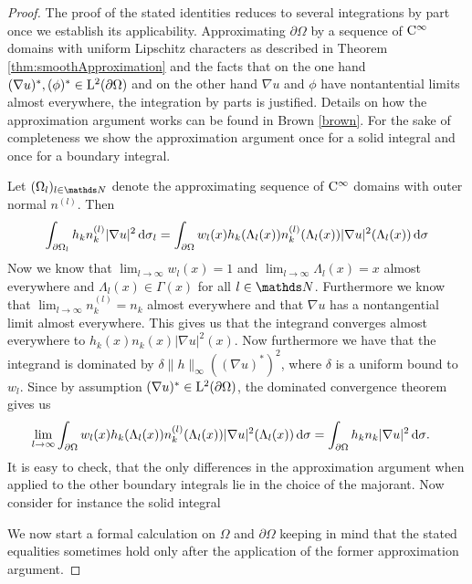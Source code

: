 \begin{proof}
  The proof of the stated identities reduces to several integrations by part  once we establish its applicability. 
  Approximating $\partial \Omega$ by a sequence of $\mathrm{C}^\infty$ domains with uniform Lipschitz characters as described in Theorem \ref{thm:smoothApproximation} and the facts that on the one hand $(\nabla u)^*, (\phi)^* \in \mathrm{L}^2(\partial\Omega)$ and on the other hand $\nabla u$ and $\phi$ have nontantential limits almost everywhere, the integration by parts is justified.
  Details on how the approximation argument works can be found in Brown \ref{brown}.
  For the sake of completeness we show the approximation argument once for a solid integral and once for a boundary integral.

  Let $(\Omega_l)_{l \in \N}$ denote the approximating sequence of $\mathrm{C}^\infty$ domains with outer normal $n^{(l)}$.
  Then
  \begin{align*}
    \int_{\partial\Omega_l} h_k n_k^{(l)} |\nabla u|^2 \, {\operatorname{d}\!{\sigma}}_l
    = \int_{\partial \Omega} w_l(x) h_k(\Lambda_l(x)) n_k^{(l)}(\Lambda_l(x)) |\nabla u|^2(\Lambda_l(x)) \, {\operatorname{d}\!{\sigma}}
  \end{align*}
  Now we know that $\lim_{l \to \infty} w_l(x) = 1$ and $\lim_{l \to \infty} \Lambda_l(x) = x$ almost everywhere and $\Lambda_l(x) \in \Gamma(x)$ for all $l \in \N$.
  Furthermore we know that $\lim_{l \to \infty} n_k^{(l)} = n_k$ almost everywhere and that $\nabla u$ has a nontangential limit almost everywhere.
  This gives us that the integrand converges almost everywhere to $ h_k(x) n_k(x) |\nabla u|^2(x)$.
  Now furthermore we have that the integrand is dominated by $\delta \|h\|_\infty ((\nabla u)^*)^2$, where $\delta$ is a uniform bound to $w_l$. Since by assumption $(\nabla u)^* \in \mathrm{L}^2(\partial\Omega)$, the dominated convergence theorem gives us
  \begin{align*}
    \lim_{l \to \infty} \int_{\partial \Omega} w_l(x) h_k(\Lambda_l(x)) n_k^{(l)}(\Lambda_l(x)) |\nabla u|^2(\Lambda_l(x)) \, {\operatorname{d}\!{\sigma}} 
    &= 
    \int_{\partial\Omega} h_k n_k |\nabla u|^2 \, {\operatorname{d}\!{\sigma}}.
  \end{align*}
  It is easy to check, that the only differences in the approximation argument when applied to the other boundary integrals lie in the choice of the majorant.
  Now consider for instance the solid integral

  We now start a formal calculation on $\Omega$ and $\partial\Omega$ keeping in mind that the stated equalities sometimes hold only after the application of the former approximation argument.


\end{proof}
